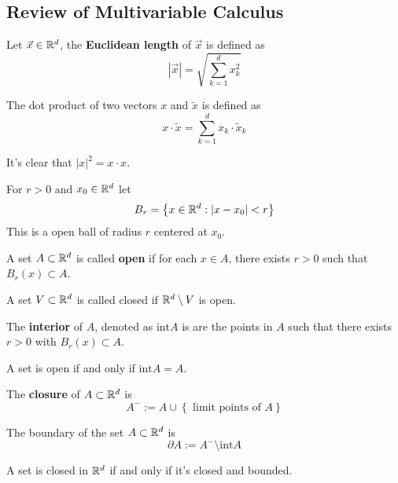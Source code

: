 \subsection{Review of Multivariable Calculus}
\begin{definition}
	Let $\vec x \in \mathbb R^d$, the \textbf{Euclidean length} of $\vec x$ is defined as
	\[ |\vec x| = \sqrt{\sum_{k=1}^{d} x_k^2}\]
\end{definition}
\begin{definition}
	The dot product of two vectors $x$ and $\tilde x$ is defined as
	\[ x \cdot \tilde x = \sum_{k=1}^{d} x_k \cdot \tilde x_k\]
\end{definition}
\begin{remark}
	It's clear that $|x|^2 = x \cdot x$.
\end{remark}
\begin{definition}
	For $r > 0$ and $x_0 \in \mathbb R^d$ let
	\[ B_r = \left\{ x \in \mathbb R^d : |x - x_0| < r \right\}\]
	This is a open ball of radius $r$ centered at $x_0$.
\end{definition}
\begin{definition}
	A set $A \subset \mathbb R^d$ is called \textbf{open} if for each $x \in A$, there exists $r > 0$ such that $B_r(x) \subset A$. 
\end{definition}
\begin{definition}
	A set $V \subset \mathbb R^d$ is called closed if $\mathbb R^d \setminus V$ is open. 
\end{definition}
\begin{definition}
	The \textbf{interior} of $A$, denoted as $\mathrm{int} A$ is are the points in $A$ such that there exists $r > 0$ with $B_r(x) \subset A$.
\end{definition}
\begin{theorem}
	A set is open if and only if $\mathrm{int} A = A$.
\end{theorem}
\begin{definition}
	The \textbf{closure} of $A \subset \mathbb R^d$ is
	\[ A^{-} := A \cup \left\{ \text{ limit points of $A$} \right\}\]
\end{definition}
\begin{definition}
	The boundary of the set $A \subset \mathbb R^d$ is
	\[ \partial A := A^{-} \setminus \mathrm{int} A\]
\end{definition}
\begin{theorem}
	A set is closed in $\mathbb R^d$ if and only if it's closed and bounded.
\end{theorem}
